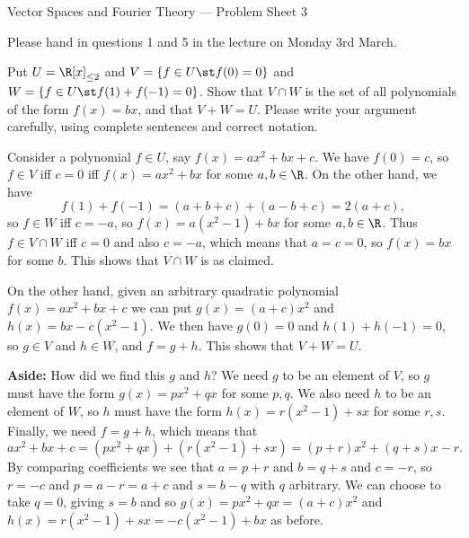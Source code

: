 


\begin{center}
 {\huge Vector Spaces and Fourier Theory ---
   Problem Sheet 3
 }
\end{center}

\begin{rubric}
 Please hand in questions 1 and 5 in the lecture on Monday
 3rd March.
\end{rubric}

\begin{exercise}\label{ex-quad-intersection}
 Put $U=\R[x]_{\leq 2}$ and $V=\{f\in U\st f(0)=0\}$ and
 $W=\{f\in U\st f(1)+f(-1)=0\}$.  Show that $V\cap W$ is the
 set of all polynomials of the form $f(x)=bx$, and that
 $V+W=U$.  Please write your argument carefully, using
 complete sentences and correct notation.
\end{exercise}
\begin{solution}
 Consider a polynomial $f\in U$, say $f(x)=ax^2+bx+c$.  We
 have $f(0)=c$, so $f\in V$ iff $c=0$ iff $f(x)=ax^2+bx$ for
 some $a,b\in\R$.  On the other hand, we have 
 \[ f(1) + f(-1) = (a+b+c) + (a-b+c) = 2(a+c), \]
 so $f\in W$ iff $c=-a$, so $f(x)=a(x^2-1)+bx$ for some
 $a,b\in\R$.  Thus $f\in V\cap W$ iff $c=0$ and also $c=-a$,
 which means that $a=c=0$, so $f(x)=bx$ for some $b$.  This
 shows that $V\cap W$ is as claimed.

 On the other hand, given an arbitrary quadratic polynomial
 $f(x)=ax^2+bx+c$ we can put $g(x)=(a+c)x^2$ and
 $h(x)=bx-c(x^2-1)$.  We then have $g(0)=0$ and
 $h(1)+h(-1)=0$, so $g\in V$ and $h\in W$, and $f=g+h$.
 This shows that $V+W=U$.

 \textbf{Aside:} 
 How did we find this $g$ and $h$?  We need $g$ to be an element of
 $V$, so $g$ must have the form $g(x)=px^2+qx$ for some $p,q$.  We
 also need $h$ to be an element of $W$, so $h$ must have the form
 $h(x)=r(x^2-1)+sx$ for some $r,s$.  Finally, we need $f=g+h$, which
 means that 
 \[ ax^2+bx+c = (px^2+qx)+(r(x^2-1)+sx) 
     = (p+r)x^2 + (q+s)x - r.
 \] 
 By comparing coefficients we see that $a=p+r$ and $b=q+s$ and $c=-r$,
 so $r=-c$ and $p=a-r=a+c$ and $s=b-q$ with $q$ arbitrary.  We can
 choose to take $q=0$, giving $s=b$ and so $g(x)=px^2+qx=(a+c)x^2$ and
 $h(x)=r(x^2-1)+sx=-c(x^2-1)+bx$ as before.
\end{solution}

